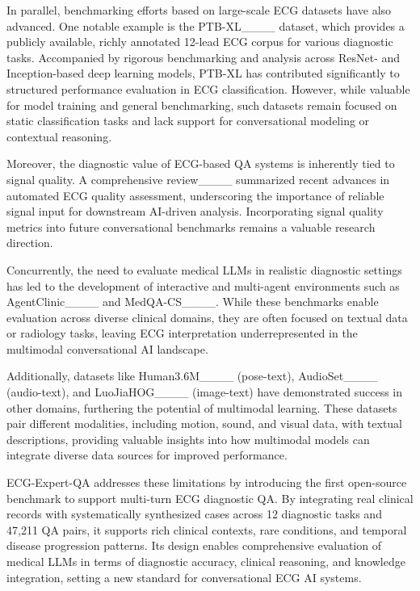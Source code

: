 In parallel, benchmarking efforts based on large-scale ECG datasets have also advanced. One notable example is the PTB-XL____ dataset, which provides a publicly available, richly annotated 12-lead ECG corpus for various diagnostic tasks. Accompanied by rigorous benchmarking and analysis across ResNet- and Inception-based deep learning models, PTB-XL has contributed significantly to structured performance evaluation in ECG classification. However, while valuable for model training and general benchmarking, such datasets remain focused on static classification tasks and lack support for conversational modeling or contextual reasoning.

Moreover, the diagnostic value of ECG-based QA systems is inherently tied to signal quality. A comprehensive review____ summarized recent advances in automated ECG quality assessment, underscoring the importance of reliable signal input for downstream AI-driven analysis. Incorporating signal quality metrics into future conversational benchmarks remains a valuable research direction.

Concurrently, the need to evaluate medical LLMs in realistic diagnostic settings has led to the development of interactive and multi-agent environments such as AgentClinic____ and MedQA-CS____. While these benchmarks enable evaluation across diverse clinical domains, they are often focused on textual data or radiology tasks, leaving ECG interpretation underrepresented in the multimodal conversational AI landscape.

Additionally, datasets like Human3.6M____ (pose-text), AudioSet____ (audio-text), and LuoJiaHOG____ (image-text) have demonstrated success in other domains, furthering the potential of multimodal learning. These datasets pair different modalities, including motion, sound, and visual data, with textual descriptions, providing valuable insights into how multimodal models can integrate diverse data sources for improved performance.

ECG-Expert-QA addresses these limitations by introducing the first open-source benchmark to support multi-turn ECG diagnostic QA. By integrating real clinical records with systematically synthesized cases across 12 diagnostic tasks and 47,211 QA pairs, it supports rich clinical contexts, rare conditions, and temporal disease progression patterns. Its design enables comprehensive evaluation of medical LLMs in terms of diagnostic accuracy, clinical reasoning, and knowledge integration, setting a new standard for conversational ECG AI systems.